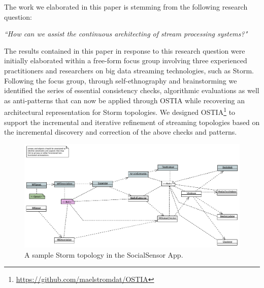 
The work we elaborated in this paper is stemming from the following research question:

\begin{center}
\emph{``How can we assist the continuous architecting of stream processing systems?"}
\end{center}

The results contained in this paper in response to this research question were initially elaborated within a free-form focus group \cite{focusgroup} involving three experienced practitioners and researchers on big data streaming technologies, such as Storm. Following the focus group, through self-ethnography \cite{selfeth} and brainstorming we identified the series of essential consistency checks, algorithmic evaluations as well as anti-patterns that can now be applied through OSTIA while recovering an architectural representation for Storm topologies. We designed OSTIA\footnote{\url{https://github.com/maelstromdat/OSTIA}} to support the incremental and iterative refinement of streaming topologies based on the incremental discovery and correction of the above checks and patterns.

\begin{figure}
\begin{center}
\includegraphics[width=12cm]{images/socialsensor}
\caption{A sample Storm topology in the SocialSensor App.}
\end{center}
\label{topo1}
\end{figure}

